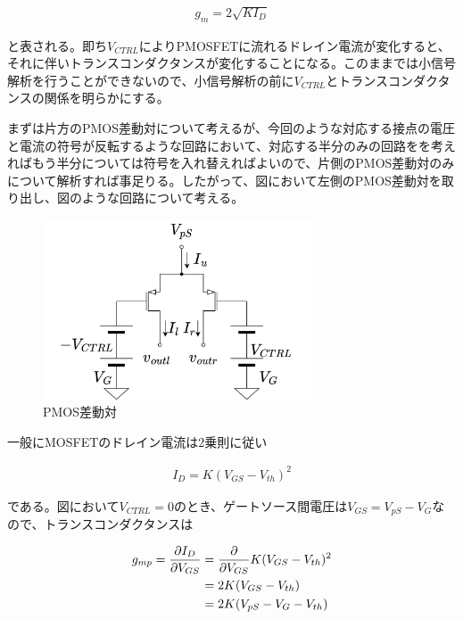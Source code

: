 \documentclass[twocolumn]{jsarticle}
\begin{document}
\begin{align}
    g_{m}=2\sqrt{KI_{D}} \label{eq:gm}
\end{align}

と表される。即ち$V_{CTRL}$によりPMOSFETに流れるドレイン電流が変化すると、それに伴いトランスコンダクタンスが変化することになる。このままでは小信号解析を行うことができないので、小信号解析の前に$V_{CTRL}$とトランスコンダクタンスの関係を明らかにする。\par
まずは片方のPMOS差動対について考えるが、今回のような対応する接点の電圧と電流の符号が反転するような回路において、対応する半分のみの回路をを考えればもう半分については符号を入れ替えればよいので、片側のPMOS差動対のみについて解析すれば事足りる。したがって、図において左側のPMOS差動対を取り出し、図のような回路について考える。

\begin{figure}[h]
    \begin{center}
        \includegraphics*[width=80mm]{figures/pmos_diff.png}
        \caption{PMOS差動対}
        \label{fig:pmos_diff}
    \end{center}
\end{figure}%

一般にMOSFETのドレイン電流は2乗則に従い

\begin{align}
    I_{D}=K(V_{GS}-V_{th})^{2}  \label{eq:square}
\end{align}

である。図において$V_{CTRL}=0$のとき、ゲートソース間電圧は\nobreak$V_{GS}=V_{pS}-V_{G}$なので、トランスコンダクタンスは

\begin{align}
    g_{mp} = \frac{\partial I_{D}}{\partial V_{GS}} &= \frac{\partial}{\partial V_{GS}} K(V_{GS}-V_{th})^{2} \notag\\
    &=2K(V_{GS}-V_{th})    \notag\\ 
    &=2K(V_{pS}-V_{G}-V_{th})   \label{eq:g_mp}
\end{align}
\end{document}

